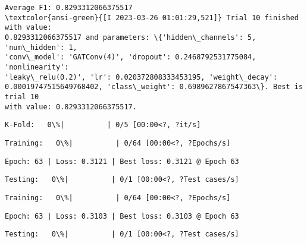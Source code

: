 \documentclass[11pt]{article}
\begin{document}
    
    \begin{Verbatim}[commandchars=\\\{\}]
Average F1: 0.8293312066375517
\textcolor{ansi-green}{[I 2023-03-26 01:01:29,521]} Trial 10 finished with value:
0.8293312066375517 and parameters: \{'hidden\_channels': 5, 'num\_hidden': 1,
'conv\_model': 'GATConv(4)', 'dropout': 0.2468792531775084, 'nonlinearity':
'leaky\_relu(0.2)', 'lr': 0.020372808333453195, 'weight\_decay':
0.00019747515649768402, 'class\_weight': 0.6989627867547363\}. Best is trial 10
with value: 0.8293312066375517.
    \end{Verbatim}

    
    \begin{Verbatim}[commandchars=\\\{\}]
K-Fold:   0\%|          | 0/5 [00:00<?, ?it/s]
    \end{Verbatim}

    
    
    \begin{Verbatim}[commandchars=\\\{\}]
Training:   0\%|          | 0/64 [00:00<?, ?Epochs/s]
    \end{Verbatim}

    
    \begin{Verbatim}[commandchars=\\\{\}]
Epoch: 63 | Loss: 0.3121 | Best loss: 0.3121 @ Epoch 63
    \end{Verbatim}

    
    \begin{Verbatim}[commandchars=\\\{\}]
Testing:   0\%|          | 0/1 [00:00<?, ?Test cases/s]
    \end{Verbatim}

    
    
    \begin{Verbatim}[commandchars=\\\{\}]
Training:   0\%|          | 0/64 [00:00<?, ?Epochs/s]
    \end{Verbatim}

    
    \begin{Verbatim}[commandchars=\\\{\}]
Epoch: 63 | Loss: 0.3103 | Best loss: 0.3103 @ Epoch 63
    \end{Verbatim}

    
    \begin{Verbatim}[commandchars=\\\{\}]
Testing:   0\%|          | 0/1 [00:00<?, ?Test cases/s]
    \end{Verbatim}
\end{document}
